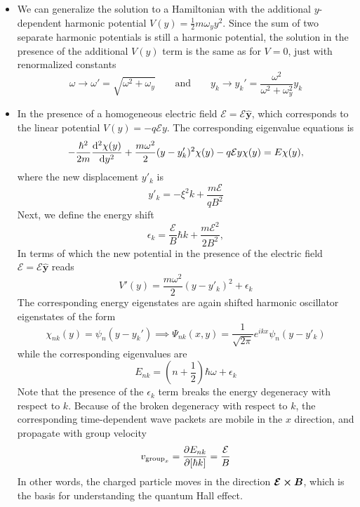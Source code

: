 \documentclass[11pt, a4paper]{article}
\newcommand{\eqtext}[1]{\qquad \text{#1} \qquad}
\newcommand{\Ham}{Hamiltonian\xspace}
\renewcommand{\vec}[1]{\bm{#1}}  %
\newcommand{\uvec}[1]{\hat{\vec{#1}}}  %
\newcommand{\B}{\vec{B}}  %
\newcommand{\p}{\psi}  %
\renewcommand{\P}{\Psi}  %
\begin{document}
\begin{itemize}
	\item We can generalize the solution to a \Ham with the additional $ y $-dependent harmonic potential $ V(y) = \frac{1}{2}m\omega_{y}y^{2} $. Since the sum of two separate harmonic potentials is still a harmonic potential, the solution in the presence of the additional $ V(y) $ term is the same as for $ V = 0 $, just with renormalized constants
	\begin{equation*}
		\omega \to \omega' = \sqrt{\omega^{2} + \omega_{y}} \eqtext{and} y_{k} \to y_{k}' = \frac{\omega^{2}}{\omega^{2} + \omega_{y}^{2}}y_{k}
	\end{equation*}
	
	\item In the presence of a homogeneous electric field $ \bm{\mathcal{E}} = \mathcal{E}\uvec{y} $, which corresponds to the linear potential $ V(y) = -q\mathcal{E}y $. The corresponding eigenvalue equations is
	\begin{equation*}
		-\frac{\hbar^{2}}{2m} \dv[2]{\chi(y)}{y} + \frac{m\omega^{2}}{2}(y - y'_{k})^{2}\chi(y) - q \mathcal{E}y\chi(y) = E\chi(y),
	\end{equation*}
	where the new displacement $ y'_{k} $ is
	\begin{equation*}
		y'_{k} = - \xi^{2}k + \frac{m \mathcal{E}}{qB^{2}}
	\end{equation*}
	Next, we define the energy shift
	\begin{equation*}
		\epsilon_{k} = \frac{\mathcal{E}}{B}\hbar k + \frac{m \mathcal{E}^{2}}{2B^{2}},
	\end{equation*}
	In terms of which the new potential in the presence of the electric field $ \bm{\mathcal{E}} = \mathcal{E}\uvec{y} $ reads
	\begin{equation*}
		V'(y) = \frac{m\omega^{2}}{2}(y - y'_{k})^{2} + \epsilon_{k}
	\end{equation*}
	The corresponding energy eigenstates are again shifted harmonic oscillator eigenstates of the form
	\begin{equation*}
		\chi_{nk}(y) = \p_{n}(y - y_{k}') \implies \P_{nk}(x, y) = \frac{1}{\sqrt{2\pi}}e^{ikx} \psi_{n}(y - y'_{k})
	\end{equation*}
	while the corresponding eigenvalues are
	\begin{equation*}
		E_{nk} = \left(n + \frac{1}{2}\right)\hbar \omega + \epsilon_{k}
	\end{equation*}
	Note that the presence of the $ \epsilon_{k} $ term breaks the energy degeneracy with respect to $ k $. Because of the broken degeneracy with respect to $ k $, the corresponding time-dependent wave packets are mobile in the $ x $ direction, and propagate with group velocity
	\begin{equation*}
		v_{\text{group}_{x}} = \pdv{E_{nk}}{[\hbar k]} = \frac{\mathcal{E}}{B}
	\end{equation*}
	In other words, the charged particle moves in the direction $ \bm{\mathcal{E}} \cross \B $, which is the basis for understanding the quantum Hall effect.
	
\end{itemize}
\end{document}
